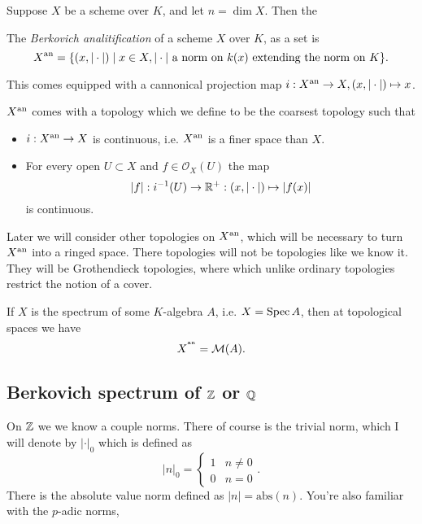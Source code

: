 Suppose $X$ be a scheme over $K$, and let $n = \dim X$. 
Then the 
\begin{definition}
	The \emph{Berkovich analitification} of a scheme $X$ over  $K$, as a set is \[
		X{}^{\text{an}} = \{(x, |\cdot |)  \mid x\in X, |\cdot | \text{ a norm on } k(x) \text{ extending the norm on }K \} 
	.\] 

	This comes equipped with a cannonical projection map $i: X{}^{\text{an}} \to X, (x, |\cdot |) \mapsto  x$.
	
	$X{}^{\text{an}} $ comes with a topology which we define to be the coarsest topology such that 
	\begin{itemize}
		\item $i: X{}^{\text{an}} \to X$ is continuous, i.e. $X{}^{\text{an}}$ is a finer space than  $X$. 
		\item For every open $U \subset X$ and $f \in \mathcal{O}_X(U)$ the map  \[
				|f|: i^{-1}(U) \to \mathbb{R}^{+}: (x, |\cdot |) \mapsto  |f(x)|
		\] 
		is continuous.
	\end{itemize}

\end{definition}
\begin{remark}
	Later we will consider other topologies on $X{}^{\text{an}}$, which will be necessary to turn $X{}^{\text{an}} $ into a ringed space. 
	There topologies will not be topologies like we know it. They will be Grothendieck topologies, where which unlike ordinary topologies restrict the notion of a cover. 
\end{remark}
\begin{remark}
	If $X$ is the spectrum of some $K$-algebra $A$, i.e. $X = \operatorname{Spec} A$, then at topological spaces  we have \[
		X^{{}^{\text{an}}} = \mathcal{M} (A)
	.\] 

\end{remark}



\subsection{Berkovich spectrum of $\mathbb{Z}$ or $\mathbb{Q}$} \label{sec:berkovich_spectrum_of_Z}

On $\mathbb{Z}$ we we know a couple norms. There of course is the trivial norm, which I will denote by $|\cdot |_0$ which is defined as \[
|n|_0 = \begin{cases}
	1 & n \ne 0 \\
	0 & n = 0
\end{cases}
.\]  
There is the absolute value norm defined as $|n| = \mathrm{abs}(n)$. You're also familiar with the $p$-adic norms, 



